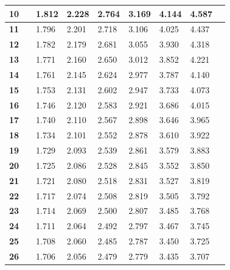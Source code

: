 \begin{longtable}{|l|l l|l|l|l|l|l|l|}
    \textbf{10} & & 1.812 & 2.228 & 2.764 & 3.169 & 4.144 & 4.587\\ \hline
    
    \textbf{11} & & 1.796 & 2.201 & 2.718 & 3.106 & 4.025 & 4.437\\ \hline
    
    \textbf{12} & & 1.782 & 2.179 & 2.681 & 3.055 & 3.930 & 4.318\\ \hline
    
    \textbf{13} & & 1.771 & 2.160 & 2.650 & 3.012 & 3.852 & 4.221\\ \hline
    
    \textbf{14} & & 1.761 & 2.145 & 2.624 & 2.977 & 3.787 & 4.140\\ \hline
    
    \textbf{15} & & 1.753 & 2.131 & 2.602 & 2.947 & 3.733 & 4.073\\ \hline
    
    \textbf{16} & & 1.746 & 2.120 & 2.583 & 2.921 & 3.686 & 4.015\\ \hline
    
    \textbf{17} & & 1.740 & 2.110 & 2.567 & 2.898 & 3.646 & 3.965\\ \hline
    
    \textbf{18} & & 1.734 & 2.101 & 2.552 & 2.878 & 3.610 & 3.922\\ \hline
    
    \textbf{19} & & 1.729 & 2.093 & 2.539 & 2.861 & 3.579 & 3.883\\ \hline
    
    \textbf{20} & & 1.725 & 2.086 & 2.528 & 2.845 & 3.552 & 3.850\\ \hline
    
    \textbf{21} & & 1.721 & 2.080 & 2.518 & 2.831 & 3.527 & 3.819\\ \hline
    
    \textbf{22} & & 1.717 & 2.074 & 2.508 & 2.819 & 3.505 & 3.792\\ \hline
    
    \textbf{23} & & 1.714 & 2.069 & 2.500 & 2.807 & 3.485 & 3.768\\ \hline
    
    \textbf{24} & & 1.711 & 2.064 & 2.492 & 2.797 & 3.467 & 3.745\\ \hline
    
    \textbf{25} & & 1.708 & 2.060 & 2.485 & 2.787 & 3.450 & 3.725\\ \hline
    
    \textbf{26} & & 1.706 & 2.056 & 2.479 & 2.779 & 3.435 & 3.707\\ \hline
    

\end{longtable}
